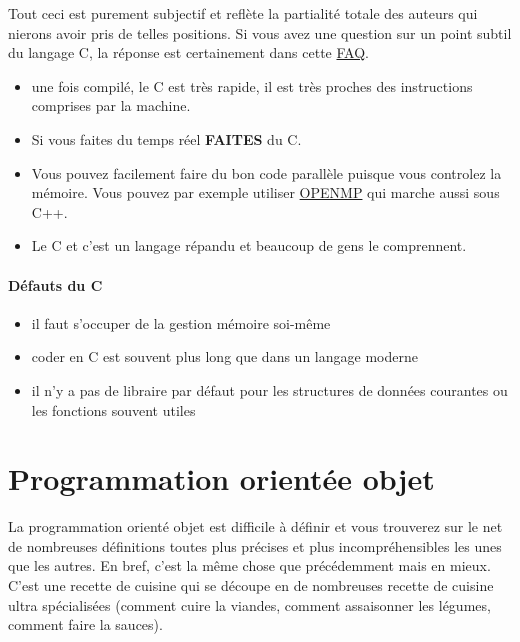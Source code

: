 Tout ceci est purement subjectif et reflète la partialité totale des auteurs qui nierons
 avoir pris de telles positions.
 Si vous avez une question sur un point subtil du langage C, la réponse est certainement dans cette 
 \href{http://c-faq.com/}{FAQ}.
 
 
 
\begin{itemize}
\item une fois compilé, le C est très rapide, il est très proches des instructions comprises par la machine. 
\item Si vous faites du temps réel \textbf{FAITES} du C.
\item Vous pouvez facilement faire du bon code parallèle puisque vous controlez la mémoire.
Vous pouvez par exemple utiliser \href{http://openmp.org/}{OPENMP} qui marche aussi sous C++.
\item Le C et c'est un langage répandu et beaucoup de gens le comprennent.
\end{itemize}

\paragraph{Défauts du C}

\begin{itemize}
\item il faut s'occuper de la gestion mémoire soi-même
\item coder en C est souvent plus long que dans un langage moderne
\item il n'y a pas de libraire par défaut pour les structures de données courantes ou les fonctions souvent utiles
\end{itemize}

\section{Programmation orientée objet}

La programmation orienté objet est difficile à définir et vous trouverez sur le net de nombreuses 
définitions toutes plus précises et plus incompréhensibles les unes que les autres.
 En bref, c'est la même chose que précédemment mais en mieux. C'est une recette de cuisine qui se 
découpe en de nombreuses recette de cuisine ultra spécialisées (comment cuire la viandes,
 comment assaisonner les légumes, comment faire la sauces).\\

